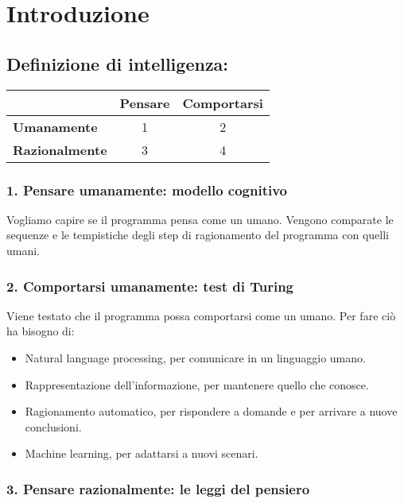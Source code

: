 \chapter{Introduzione}

\section*{Definizione di intelligenza:}

\begin{table}[h]
\centering
\begin{tabular}{lcc}
 & \textbf{Pensare} & \textbf{Comportarsi} \\
\hline
\textbf{Umanamente} & 1 & 2 \\
\textbf{Razionalmente} & 3 & 4 \\
\end{tabular}
\end{table}

\subsection*{1. Pensare umanamente: modello cognitivo}

Vogliamo capire se il programma pensa come un umano. Vengono comparate le sequenze e le tempistiche degli step di ragionamento del programma con quelli umani.

\subsection*{2. Comportarsi umanamente: test di Turing}

Viene testato che il programma possa comportarsi come un umano.
Per fare ciò ha bisogno di:

\begin{itemize}
  \item Natural language processing, per comunicare in un linguaggio umano.
  \item Rappresentazione dell'informazione, per mantenere quello che conosce.
  \item Ragionamento automatico, per rispondere a domande e per arrivare a nuove conclusioni.
  \item Machine learning, per adattarsi a nuovi scenari.
\end{itemize}

\subsection*{3. Pensare razionalmente: le leggi del pensiero}

